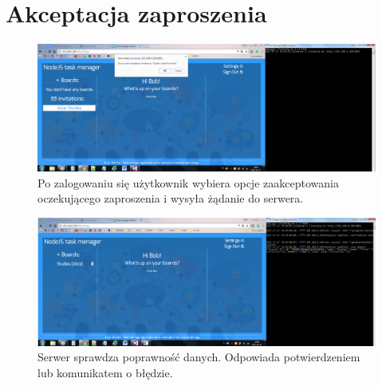 \documentclass[12pt]{report}
\begin{document}
\section{Akceptacja zaproszenia}
\begin{figure}[!hb]
\centering
\includegraphics[width=\textwidth,height=\textheight,keepaspectratio]{81.png}
\captionsetup{labelformat=empty}
\caption[]{Po zalogowaniu się użytkownik wybiera opcje zaakceptowania oczekującego zaproszenia i wysyła żądanie do serwera.}
\end{figure}
\begin{figure}[!hb]
\centering
\includegraphics[width=\textwidth,height=\textheight,keepaspectratio]{82.png}
\captionsetup{labelformat=empty}
\caption[]{Serwer sprawdza poprawność danych. Odpowiada potwierdzeniem lub komunikatem o błędzie.}
\end{figure}
\end{document}
